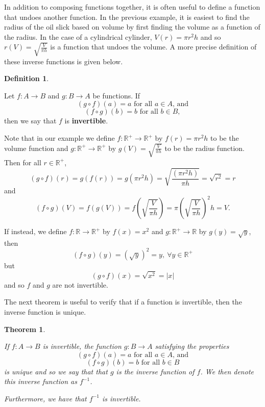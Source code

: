\documentclass[
]{book}
\newtheorem{theorem}{Theorem}[chapter]
\theoremstyle{definition}
\newtheorem{definition}{Definition}[chapter]
\theoremstyle{definition}
\theoremstyle{definition}
\theoremstyle{definition}
\theoremstyle{remark}
\begin{document}
In addition to composing functions together, it is often useful to define a function that undoes another function. In the previous example, it is easiest to find the radius of the oil slick based on volume by first finding the volume as a function of the radius. In the case of a cylindrical cylinder, \(V(r)= \pi r^2 h\) and so \(r(V)=\sqrt{\frac{V}{\pi h}}\) is a function that undoes the volume. A more precise definition of these inverse functions is given below.

\begin{definition}
\protect\hypertarget{def:unlabeled-div-67}{}\label{def:unlabeled-div-67}

Let \(f:A \rightarrow B\) and \(g:B \rightarrow A\) be functions. If
\[(g\circ f) (a)=a \mbox{ for all } a\in A \mbox{, and}\]
\[(f\circ g) (b)=b \mbox{ for all }b\in B,\] then we say that \(f\) is \textbf{invertible}.

\end{definition}

Note that in our example we define \(f:\mathbb{R}^+\rightarrow \mathbb{R}^+\) by \(f(r)= \pi r^2 h\) to be the volume function and \(g:\mathbb{R}^+\rightarrow \mathbb{R}^+\) by \(g(V)=\sqrt{\frac{V}{\pi h}}\) to be the radius function. Then for all \(r\in \mathbb{R}^+\),
\[(g\circ f) (r) = g (f(r)) = g\left(\pi r^2 h\right) = \sqrt{ \frac{\left(\pi r^2 h\right)}{\pi h}} = \sqrt{r^2}=r\] and
\[(f \circ g) (V) = f(g(V)) = f\left(\sqrt{\frac{V}{\pi h}}\right) = \pi \left(\sqrt{\frac{V}{\pi h}}\right)^2 h = V.\]

If instead, we define \(f:\mathbb{R}\rightarrow \mathbb{R}^+\) by \(f(x)=x^2\) and \(g:\mathbb{R^+} \rightarrow \mathbb{R}\) by \(g(y)=\sqrt{y}\), then \[(f\circ g) (y) =\left(\sqrt{y}\right)^2 =y, \: \forall y\in \mathbb{R}^+\] but \[(g\circ f)(x) = \sqrt{x^2} = |x|\] and so \(f\) and \(g\) are not invertible.

The next theorem is useful to verify that if a function is invertible, then the inverse function is unique.

\begin{theorem}
\protect\hypertarget{thm:invertible}{}\label{thm:invertible}

If \(f:A \rightarrow B\) is invertible, the function \(g:B\rightarrow A\) satisfying the properties
\[(g\circ f) (a)=a \mbox{ for all } a\in A \mbox{, and}\]
\[(f\circ g) (b)=b \mbox{ for all }b\in B\]
is unique and so we say that that \(g\) is the inverse function of \(f\). We then denote this inverse function as \(f^{-1}\).

Furthermore, we have that \(f^{-1}\) is invertible.

\end{theorem}
\end{document}
